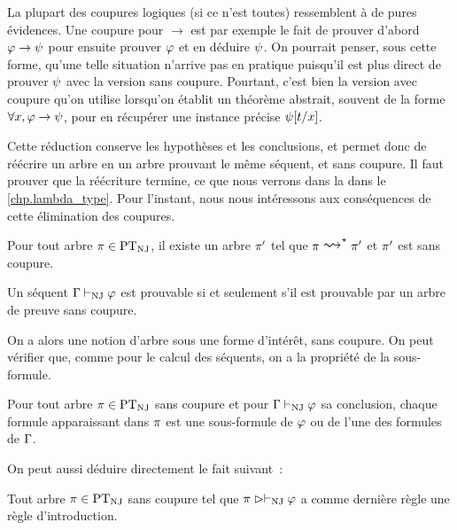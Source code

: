 \begin{remark}
  La plupart des coupures logiques (si ce n'est toutes) ressemblent à de pures
  évidences. Une coupure pour $\to$ est par exemple le fait de prouver d'abord
  $\varphi\to\psi$ pour ensuite prouver $\varphi$ et en déduire $\psi$. On
  pourrait penser, sous cette forme, qu'une telle situation n'arrive pas en
  pratique puisqu'il est plus direct de prouver $\psi$ avec la version sans
  coupure. Pourtant, c'est bien la version avec coupure qu'on utilise lorsqu'on
  établit un théorème abstrait, souvent de la forme
  $\forall x, \varphi \to \psi$, pour en récupérer une instance précise
  $\psi[t/x]$.
\end{remark}

Cette réduction conserve les hypothèses et les conclusions, et permet donc de
réécrire un arbre en un arbre prouvant le même séquent, et sans coupure. Il
faut prouver que la réécriture termine, ce que nous verrons dans la
dans le \cref{chp.lambda_type}.
Pour l'instant, nous nous intéressons aux conséquences de cette élimination des
coupures.

\begin{theorem}
  Pour tout arbre $\pi\in\operatorname{PT}_{\operatorname{NJ}}$, il existe un arbre $\pi'$ tel que
  $\varPT\rtClot{\reecr{}}\varPT'$ et $\pi'$ est sans coupure.

  Un séquent $\Gamma\vdash_{\operatorname{NJ}}\varphi$ est prouvable si et seulement s'il est
  prouvable par un arbre de preuve sans coupure.
\end{theorem}

On a alors une notion d'arbre sous une forme d'intérêt, sans coupure. On peut
vérifier que, comme pour le calcul des séquents, on a la propriété de la
sous-formule.

\begin{property}
  Pour tout arbre $\pi\in\operatorname{PT}_{\operatorname{NJ}}$ sans coupure et pour $\Gamma\vdash_{\operatorname{NJ}}\varphi$
  sa conclusion, chaque formule apparaissant dans $\pi$ est une sous-formule
  de $\varphi$ ou de l'une des formules de $\Gamma$.
\end{property}

On peut aussi déduire directement le fait suivant~:

\begin{proposition}
  Tout arbre $\pi\in\operatorname{PT}_{\operatorname{NJ}}$ sans coupure tel que $\pi\mathrel{\rhd} \vdash_{\operatorname{NJ}}\varphi$
  a comme dernière règle une règle d'introduction.
\end{proposition}

